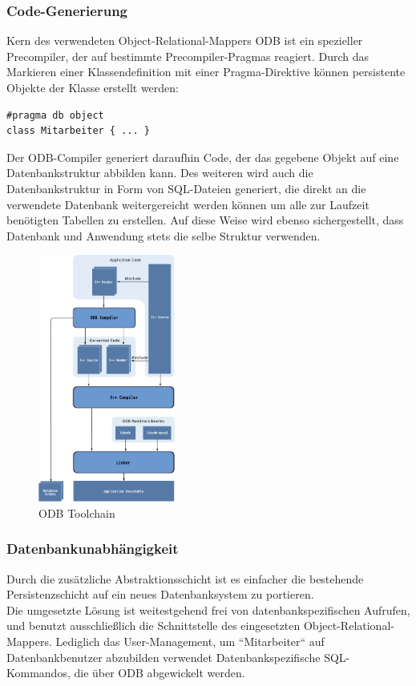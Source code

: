 \subsubsection{Code-Generierung}
Kern des verwendeten Object-Relational-Mappers ODB ist ein spezieller Precompiler, der auf bestimmte Precompiler-Pragmas reagiert.
Durch das Markieren einer Klassendefinition mit einer Pragma-Direktive können persistente Objekte der Klasse erstellt werden:\\
\begin{lstlisting}
#pragma db object
class Mitarbeiter { ... }
\end{lstlisting}
Der ODB-Compiler generiert daraufhin Code, der das gegebene Objekt auf eine Datenbankstruktur abbilden kann. Des weiteren wird auch die Datenbankstruktur in Form von SQL-Dateien generiert, die direkt an die verwendete Datenbank weitergereicht werden können um alle zur Laufzeit benötigten Tabellen zu erstellen. Auf diese Weise wird ebenso sichergestellt, dass Datenbank und Anwendung stets die selbe Struktur verwenden.\\
\begin{figure}[htp!]
	\begin{center}
		\includegraphics[width=0.4\textwidth]{odb-flow}
	\end{center}
	\caption{ODB Toolchain \cite{ODB_Manual}}
	\label{ODB-Flow}
\end{figure}

\newpage

\subsubsection{Datenbankunabhängigkeit}
Durch die zusätzliche Abstraktionsschicht ist es einfacher die bestehende Persistenzschicht auf ein neues Datenbanksystem zu portieren.\\
Die umgesetzte Lösung ist weitestgehend frei von datenbankspezifischen Aufrufen, und benutzt ausschließlich die Schnittstelle des eingesetzten Object-Relational-Mappers.
Lediglich das User-Management, um ``Mitarbeiter`` auf Datenbankbenutzer abzubilden verwendet Datenbankspezifische SQL-Kommandos, die über ODB abgewickelt werden.

